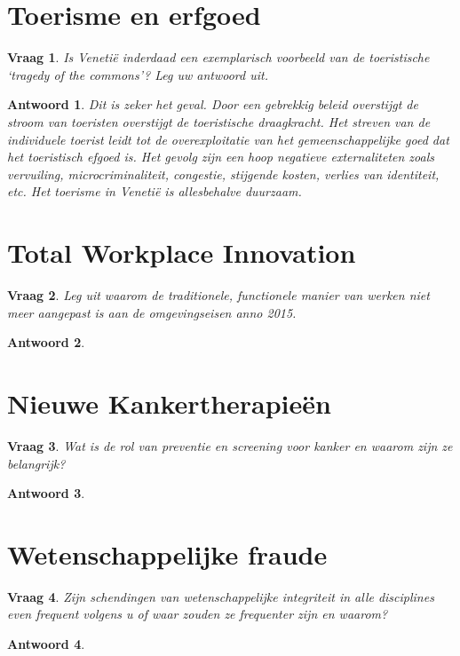 \documentclass{article}
\theoremstyle{plain}
\newtheorem{question}{Vraag}
\theoremstyle{nonumberplain}
\newtheorem{answer}{Antwoord}
\begin{document}
\section{Toerisme en erfgoed}

\begin{question}
Is Venetië inderdaad een exemplarisch voorbeeld van de toeristische `tragedy of
the commons'? Leg uw antwoord uit.
\end{question}

\begin{answer}

Dit is zeker het geval. Door een gebrekkig beleid overstijgt de stroom van
toeristen overstijgt de toeristische draagkracht. Het streven van de individuele
toerist leidt tot de overexploitatie van het gemeenschappelijke goed dat het
toeristisch efgoed is. Het gevolg zijn een hoop negatieve externaliteten zoals
vervuiling, microcriminaliteit, congestie, stijgende kosten, verlies van
identiteit, etc. Het toerisme in Venetië is allesbehalve duurzaam.

\end{answer}

\section{Total Workplace Innovation}

\begin{question}
Leg uit waarom de traditionele, functionele manier van werken niet meer
aangepast is aan de omgevingseisen anno 2015.
\end{question}

\begin{answer}

\end{answer}

\section{Nieuwe Kankertherapieën}

\begin{question}
Wat is de rol van preventie en screening voor kanker en waarom zijn ze
belangrijk?
\end{question}

\begin{answer}

\end{answer}

\section{Wetenschappelijke fraude}

\begin{question}
Zijn schendingen van wetenschappelijke integriteit in alle disciplines even
frequent volgens u of waar zouden ze frequenter zijn en waarom?
\end{question}

\begin{answer}

\end{answer}
\end{document}
